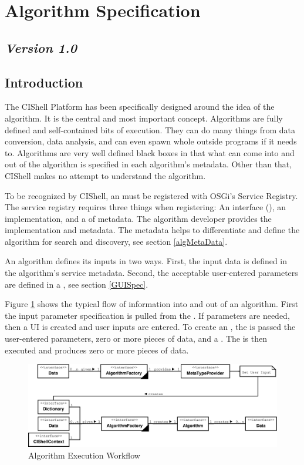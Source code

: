 \section{Algorithm Specification}

\subsection*{\textit{Version 1.0}}

\subsection{Introduction}

The CIShell Platform has been specifically designed around the idea of the
algorithm. It is the central and most important concept. Algorithms are fully
defined and self-contained bits of execution. They can do many things from data
conversion, data analysis, and can even spawn whole outside programs if it needs
to. Algorithms are very well defined black boxes in that what can come into and
out of the algorithm is specified in each algorithm's metadata. Other than that,
CIShell makes no attempt to understand the algorithm.

To be recognized by CIShell, an  must be registered with
OSGi's Service Registry. The service registry requires three things when
registering: An interface (), an implementation, and a
 of metadata. The algorithm developer provides the
implementation and metadata. The metadata helps to differentiate and define the
algorithm for search and discovery, see section \ref{algMetaData}.

An algorithm defines its inputs in two ways. First, the input data is defined in
the algorithm's service metadata. Second, the acceptable user-entered parameters
are defined in a , see section \ref{GUISpec}.

Figure \ref{fig:algExecWorkflow} shows the typical flow of information into and
out of an algorithm. First the input parameter specification is pulled from the
. If parameters are needed, then a UI is created and user
inputs are entered. To create an , the 
is passed the user-entered parameters, zero or more pieces of data, and a
. The  is then executed and produces zero
or more pieces of data.

\begin{figure}[htb!]
\centering
\includegraphics[width=150mm]{../img/algExecWorkflow.pdf}
\caption{Algorithm Execution Workflow}
\label{fig:algExecWorkflow}
\end{figure}

